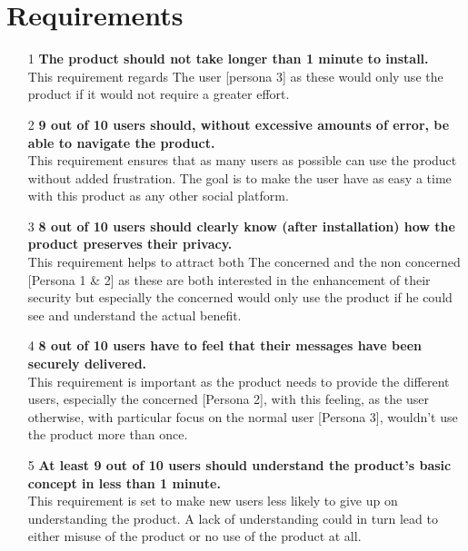 \section{Requirements}
\begin{itemize}
    \item[1] \textbf{The product should not take longer than 1 minute to install.} \hfill \\ 
    This requirement regards The user [persona 3] as these would only use the product if it would not require a greater effort.
    \item[2] \textbf{9 out of 10 users should, without excessive amounts of error, be able to navigate the product.} \hfill \\ 
    This requirement ensures that as many users as possible can use the product without added frustration. The goal is to make the user have as easy a time with this product as any other social platform.
    \item[3] \textbf{8 out of 10 users should clearly know (after installation) how the product preserves their privacy.} \hfill \\
    This requirement helps to attract both The concerned and the non concerned [Persona 1 \& 2] as these are both interested in the enhancement of their security but especially the concerned would only use the product if he could see and understand the actual benefit.
    \item[4] \textbf{8 out of 10 users have to feel that their messages have been securely delivered.} \hfill \\
    This requirement is important as the product needs to provide the different users, especially the concerned [Persona 2], with this feeling, as the user otherwise, with particular focus on the normal user [Persona 3], wouldn't use the product more than once.
    \item[5] \textbf{At least 9 out of 10 users should understand the product's basic concept in less than 1 minute.} \hfill \\
    This requirement is set to make new users less likely to give up on understanding the product. A lack of understanding could in turn lead to either misuse of the product or no use of the product at all.
\end{itemize}

